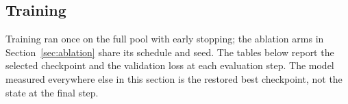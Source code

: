\documentclass[11pt,a4paper]{article}
\begin{document}
\subsection{Training}
Training ran once on the full pool with early stopping; the ablation arms in Section~\ref{sec:ablation} share its schedule and seed. The tables below report the selected checkpoint and the validation loss at each evaluation step. The model measured everywhere else in this section is the restored best checkpoint, not the state at the final step.
\begin{table}[htbp]
\centering
\renewcommand{\arraystretch}{1.15}
\caption{Training metrics for the full run. Early stopping monitored validation loss (patience 3, evaluated every 50 steps) and the best checkpoint was restored at the end, so the reported model is the one at the best step rather than the last.}
\label{tab:training}
\end{table}
\end{document}
